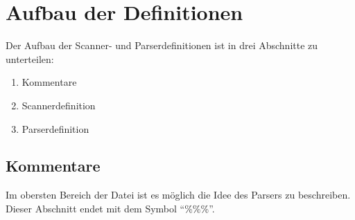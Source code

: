 %
\chapter{Aufbau der Definitionen}

Der Aufbau der Scanner- und Parserdefinitionen ist in drei Abschnitte zu unterteilen:
\begin{enumerate}
	\item Kommentare
	\item Scannerdefinition
	\item Parserdefinition
\end{enumerate}
\section{Kommentare}
Im obersten Bereich der Datei ist es möglich die Idee des Parsers zu beschreiben.
Dieser Abschnitt endet mit dem Symbol "`\%\%\%"'. 
